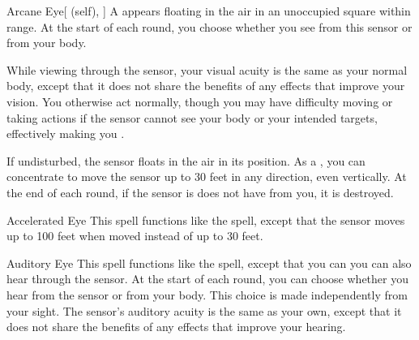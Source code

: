 \lowercase{\hypertarget{spell:Arcane Eye}{}}\label{spell:Arcane Eye}
\begin{ability}[\nth{1}]{\hypertarget{spell:Arcane Eye}{Arcane Eye}}[ (self), ]
A  appears floating in the air in an unoccupied square within \rngmed range.
At the start of each round, you choose whether you see from this sensor or from your body.

While viewing through the sensor, your visual acuity is the same as your normal body, except that it does not share the benefits of any  effects that improve your vision.
You otherwise act normally, though you may have difficulty moving or taking actions if the sensor cannot see your body or your intended targets, effectively making you \blinded.

If undisturbed, the sensor floats in the air in its position.
As a , you can concentrate to move the sensor up to 30 feet in any direction, even vertically.
At the end of each round, if the sensor is does not have  from you, it is destroyed.
\end{ability}
\vspace{0.25em}



\lowercase{\hypertarget{spell:Accelerated Eye}{}}\label{spell:Accelerated Eye}
\begin{ability}[\nth{2}]{\hypertarget{spell:Accelerated Eye}{Accelerated Eye}}
This spell functions like the  spell, except that the sensor moves up to 100 feet when moved instead of up to 30 feet.
\end{ability}
\vspace{0.25em}



\lowercase{\hypertarget{spell:Auditory Eye}{}}\label{spell:Auditory Eye}
\begin{ability}[\nth{2}]{\hypertarget{spell:Auditory Eye}{Auditory Eye}}
This spell functions like the  spell, except that you can you can also hear through the sensor.
At the start of each round, you can choose whether you hear from the sensor or from your body.
This choice is made independently from your sight.
The sensor's auditory acuity is the same as your own, except that it does not share the benefits of any  effects that improve your hearing.
\end{ability}
\vspace{0.25em}



